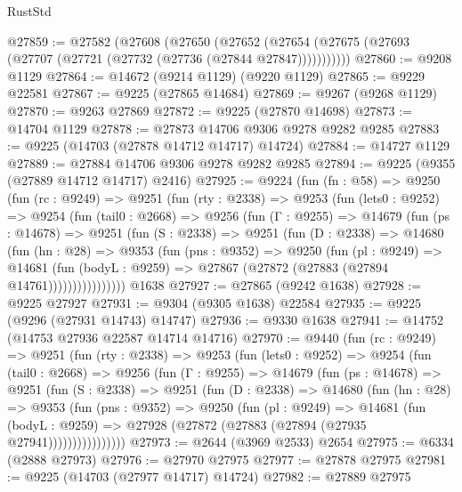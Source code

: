 \begin{lexlean}{RustStd}
\begin{coremodule}
@27859 := @27582
    (@27608
      (@27650
        (@27652 (@27654 (@27675 (@27693 (@27707 (@27721 (@27732 (@27736 (@27844 @27847)))))))))))
@27860 := @9208 @1129
@27864 := @14672 (@9214 @1129) (@9220 @1129)
@27865 := @9229 @22581
@27867 := @9225 (@27865 @14684)
@27869 := @9267 (@9268 @1129)
@27870 := @9263 @27869
@27872 := @9225 (@27870 @14698)
@27873 := @14704 @1129
@27878 := @27873 @14706 @9306 @9278 @9282 @9285
@27883 := @9225 (@14703 (@27878 @14712 @14717) @14724)
@27884 := @14727 @1129
@27889 := @27884 @14706 @9306 @9278 @9282 @9285
@27894 := @9225 (@9355 (@27889 @14712 @14717) @2416)
@27925 := @9224
    (fun (fn : @58) =>
    @9250
      (fun (rc : @9249) =>
      @9251
        (fun (rty : @2338) =>
        @9253
          (fun (lets0 : @9252) =>
          @9254
            (fun (tail0 : @2668) =>
            @9256
              (fun (Γ : @9255) =>
              @14679
                (fun (ps : @14678) =>
                @9251
                  (fun (S : @2338) =>
                  @9251
                    (fun (D : @2338) =>
                    @14680
                      (fun (hn : @28) =>
                      @9353
                        (fun (pns : @9352) =>
                        @9250
                          (fun (pl : @9249) =>
                          @14681
                            (fun (bodyL : @9259) =>
                            @27867 (@27872 (@27883 (@27894 @14761))))))))))))))))
    @1638
@27927 := @27865 (@9242 @1638)
@27928 := @9225 @27927
@27931 := @9304 (@9305 @1638) @22584
@27935 := @9225 (@9296 (@27931 @14743) @14747)
@27936 := @9330 @1638
@27941 := @14752 (@14753 @27936 @22587 @14714 @14716)
@27970 := @9440
    (fun (rc : @9249) =>
    @9251
      (fun (rty : @2338) =>
      @9253
        (fun (lets0 : @9252) =>
        @9254
          (fun (tail0 : @2668) =>
          @9256
            (fun (Γ : @9255) =>
            @14679
              (fun (ps : @14678) =>
              @9251
                (fun (S : @2338) =>
                @9251
                  (fun (D : @2338) =>
                  @14680
                    (fun (hn : @28) =>
                    @9353
                      (fun (pns : @9352) =>
                      @9250
                        (fun (pl : @9249) =>
                        @14681
                          (fun (bodyL : @9259) =>
                          @27928 (@27872 (@27883 (@27894 (@27935 @27941))))))))))))))))
@27973 := @2644 (@3969 @2533) @2654
@27975 := @6334 (@2888 @27973)
@27976 := @27970 @27975
@27977 := @27878 @27975
@27981 := @9225 (@14703 (@27977 @14717) @14724)
@27982 := @27889 @27975

\end{coremodule}
\end{lexlean}
